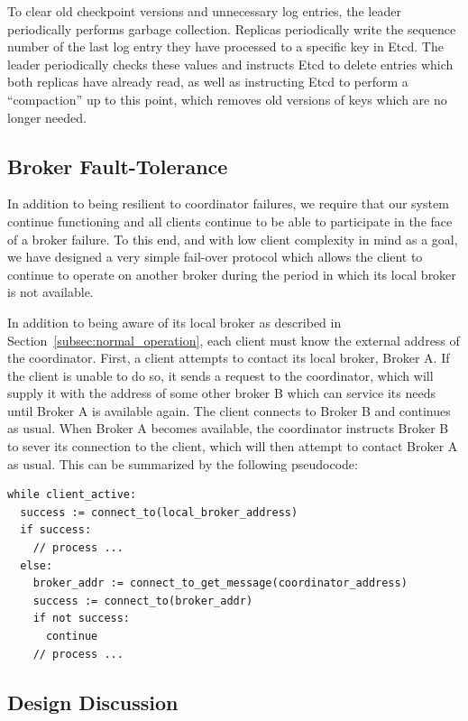 To clear old checkpoint versions and unnecessary log entries, the leader periodically performs garbage collection.
Replicas periodically write the sequence number of the last log entry they have processed to a specific key in Etcd.
The leader periodically checks these values and instructs Etcd to delete entries which both replicas have already read, as well as instructing Etcd to perform a ``compaction'' up to this point, which removes old versions of keys which are no longer needed.

\subsection{Broker Fault-Tolerance}

In addition to being resilient to coordinator failures, we require that our system continue functioning and all clients continue to be able to participate in the face of a broker failure.
To this end, and with low client complexity in mind as a goal, we have designed a very simple fail-over protocol which allows the client to continue to operate on another broker during the period in which its local broker is not available.

In addition to being aware of its local broker as described in Section~\ref{subsec:normal_operation}, each client must know the external address of the coordinator.
First, a client attempts to contact its local broker, Broker A.
If the client is unable to do so, it sends a request to the coordinator, which will supply it with the address of some other broker B which can service its needs until Broker A is available again.
The client connects to Broker B and continues as usual.
When Broker A becomes available, the coordinator instructs Broker B to sever its connection to the client, which will then attempt to contact Broker A as usual. This can be summarized by the following pseudocode:

\begin{lstlisting}[language=pseudocode,basicstyle=\small]
while client_active:
  success := connect_to(local_broker_address)
  if success:
    // process ...
  else:
    broker_addr := connect_to_get_message(coordinator_address)
    success := connect_to(broker_addr)
    if not success:
      continue
    // process ...
\end{lstlisting}

\subsection{Design Discussion}

